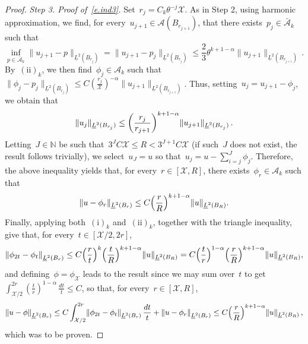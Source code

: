 \documentclass[11pt,twoside]{article} %
\numberwithin{equation}{section}
\theoremstyle{definition}
\let\originalleft\left
\let\originalright\right
\renewcommand{\left}{\mathopen{}\mathclose\bgroup\originalleft}
\renewcommand{\right}{\aftergroup\egroup\originalright}
\newcommand*{\N}{\ensuremath{\mathbb{N}}}
\newcommand{\X}{\mathcal{X}}
\newcommand{\A}{\mathcal{A}}
\newcommand{\Ahom}{\bar{\A}}
\begin{document}
\begin{proof}
\smallskip

\emph{Step 3. Proof of~\eqref{e.ind3}.} Set~$r_j = C_k \theta^{-j} \X$. As in Step 2, using harmonic approximation, we find, for every~$u_{j+1} \in \A(B_{r_{j+1}})$, that there exists~$p_j \in \Ahom_k$ such that 
\begin{equation*}  
\inf_{p \in \Ahom_k} \| u_{j+1} - p \|_{\underline{L}^2(B_{r_{j}})}  
=
\| u_{j+1} - p_{j} \|_{\underline{L}^2(B_{r_{j}})} 
\leq 
\frac23 
 \theta^{k+1-\alpha} 
  \| u_{j+1} \|_{\underline{L}^2(B_{r_{j+1}})} 
\,.
\end{equation*}
By~$\mathrm{(ii)}_{k}$, we then find~$\phi_j \in \A_{k}$ such that~$\| \phi_j -p_j  \|_{\underline{L}^2(B_{r_{j}})} \leq C ( \frac{r_j}{\X} )^{-\alpha} \| u_{j+1}  \|_{\underline{L}^2(B_{r_{j+1}})}$. Thus, setting~$u_{j} = u_{j+1} - \phi_{j}$, we obtain that 
\begin{equation*}  
\| u_{j} \|_{\underline{L}^2(B_{r_{j}})} 
\leq 
\left( \frac{r_j}{r_{j+1}} \right)^{k+1-\alpha}
\| u_{j+1} \|_{\underline{L}^2(B_{r_{j}})} 
\,.
\end{equation*}
Letting~$J \in \N$ be such that~$3^{J} C \X \leq R < 3^{J+1} C \X$ (if such~$J$ does not exist, the result follows trivially), we select~$u_J = u$ so that~$u_j = u - \sum_{i=j}^{J} \phi_j$. Therefore, the above inequality yields that, for every~$r\in [\X,R]$, there exists~$\phi_r \in \A_k$ such that 
\begin{equation*}  
 \| u - \phi_r \|_{\underline{L}^2(B_{r})} 
\leq C 
\left( \frac{r}{R} \right)^{k+1-\alpha}
\| u \|_{\underline{L}^2(B_{R})} 
.
\end{equation*}
Finally, applying both~$\mathrm{(i)}_{k}$ and~$\mathrm{(ii)}_{k}$, together with the triangle inequality, give that, for every~$t \in [\X/2,2r]$, 
\begin{equation*}  
\left\| \phi_{2t} - \phi_t \right\|_{\underline{L}^2(B_{r})} 
\leq 
C \Bigl(\frac{r}{t}\Bigr)^{k} 
\Bigl( \frac{t}{R} \Bigr)^{k+1-\alpha} \| u \|_{\underline{L}^2(B_{R})} 
=
C 
\Bigl( \frac{t}{r} \Bigr)^{1-\alpha}
\Bigl( \frac{r}{R} \Bigr)^{k+1-\alpha} \| u \|_{\underline{L}^2(B_{R})} ,
\end{equation*}
and defining~$\phi = \phi_\X$ leads to the result since we may sum over~$t$ to get~$\int_{\X/2}^{2r} ( \frac{t}{r})^{1-\alpha} \, \frac{dt}{t} \leq C$, so that, for every~$r \in [\X,R]$, 
\begin{equation*}  
\left\| u - \phi \right\|_{\underline{L}^2(B_{r})} \leq C \int_{\X/2}^{2r} \left\| \phi_{2t} - \phi_{t} \right\|_{\underline{L}^2(B_{r})} \, \frac{dt}{t}+ \left\| u - \phi_r \right\|_{\underline{L}^2(B_{r})}
\leq C 
\Bigl( \frac{r}{R} \Bigr)^{k+1-\alpha} 
\| u \|_{\underline{L}^2(B_{R})} 
\,,
\end{equation*}
which was to be proven. 


\end{proof}
\end{document}
